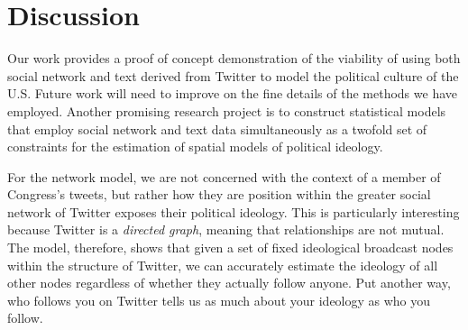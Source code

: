 \documentclass[10pt]{article}
\begin{document}
\section{Discussion}
Our work provides a proof of concept demonstration of the viability of using both social network and text derived from Twitter to model the political culture of the U.S. Future work will need to improve on the fine details of the methods we have employed. Another promising research project is to construct statistical models that employ social network and text data simultaneously as a twofold set of constraints for the estimation of spatial models of political ideology.

For the network model, we are not concerned with the context of a member of Congress's tweets, but rather how they are position within the greater social network of Twitter exposes their political ideology.  This is particularly interesting because Twitter is a \emph{directed graph}, meaning that relationships are not mutual.  The model, therefore, shows that given a set of fixed ideological broadcast nodes within the structure of Twitter, we can accurately estimate the ideology of all other nodes regardless of whether they actually follow anyone.  Put another way, who follows you on Twitter tells us as much about your ideology as who you follow.


 
\end{document}
